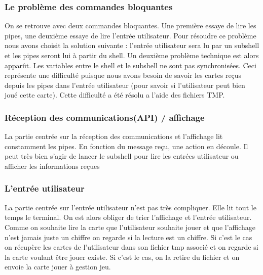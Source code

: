 \documentclass{article}
\begin{document}
\subsubsection{Le problème des commandes bloquantes}
On se retrouve avec deux commandes bloquantes. Une première essaye de lire les pipes, une deuxième essaye de lire l'entrée utilisateur. Pour résoudre ce problème nous avons choisit la solution suivante : l'entrée utilisateur sera lu par un subshell et les pipes seront lui à partir du shell. Un deuxième problème technique est alors apparût. Les variables entre le shell et le subshell ne sont pas synchronisées. Ceci représente une difficulté puisque nous avons besoin de savoir les cartes reçus depuis les pipes dans l'entrée utilisateur (pour savoir si l'utilisateur peut bien joué cette carte). Cette difficulté a été résolu a l'aide des fichiers TMP.

\subsubsection{Réception des communications(API) / affichage}
La partie centrée sur la réception des communications et l'affichage lit constamment les pipes. En fonction du message reçu, une action en découle. Il peut très bien s'agir de lancer le subshell pour lire les entrées utilisateur ou afficher les informations reçues

\subsubsection{L'entrée utilisateur}
La partie centrée sur l'entrée utilisateur n'est pas très compliquer. Elle lit tout le temps le terminal. On est alors obliger de trier l'affichage et l'entrée utilisateur. Comme on souhaite lire la carte que l'utilisateur souhaite jouer et que l'affichage n'est jamais juste un chiffre on regarde si la lecture est un chiffre. Si c'est le cas on récupère les cartes de l'utilisateur dans son fichier tmp associé et on regarde si la carte voulant être jouer existe. Si c'est le cas, on la retire du fichier et on envoie la carte jouer à gestion jeu. 
\end{document}

